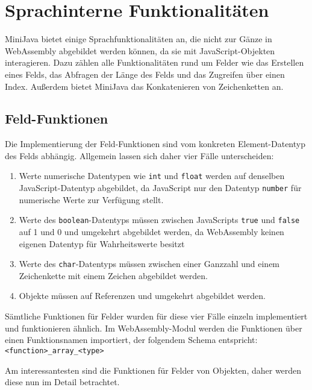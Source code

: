 \section{Sprachinterne Funktionalitäten}
\label{sec:Sprachinterne-Funktionalitäten}

MiniJava bietet einige Sprachfunktionalitäten an, die nicht zur Gänze in WebAssembly abgebildet werden können, da sie mit JavaScript-Objekten interagieren. Dazu zählen alle Funktionalitäten rund um Felder wie das Erstellen eines Felds, das Abfragen der Länge des Felds und das Zugreifen über einen Index. Außerdem bietet MiniJava das Konkatenieren von Zeichenketten an.

\subsection{Feld-Funktionen}
\label{subsec:Feld-Funktionen}

Die Implementierung der Feld-Funktionen sind vom konkreten Element-Datentyp des Felds abhängig. Allgemein lassen sich daher vier Fälle unterscheiden:

\begin{enumerate}
    \item Werte numerische Datentypen wie \lstinline{int} und \lstinline{float} werden auf denselben Ja\-va\-Script-Da\-ten\-typ abgebildet, da JavaScript nur den Datentyp \lstinline{number} für numerische Werte zur Verfügung stellt.
    \item Werte des \lstinline{boolean}-Datentyps müssen zwischen JavaScripts \lstinline{true} und \lstinline{false} auf 1 und 0 und umgekehrt abgebildet werden, da WebAssembly keinen eigenen Datentyp für Wahrheitswerte besitzt
    \item Werte des \lstinline{char}-Datentyps müssen zwischen einer Ganzzahl und einem Zeichenkette mit einem Zeichen abgebildet werden.
    \item Objekte  müssen auf Referenzen und umgekehrt abgebildet werden. 
\end{enumerate}

Sämtliche Funktionen für Felder wurden für diese vier Fälle einzeln implementiert und funktionieren ähnlich. Im WebAssembly-Modul werden die Funktionen über einen Funktionsnamen importiert, der folgendem Schema entspricht: \\
\lstinline{<function>_array_<type>}

Am interessantesten sind die Funktionen für Felder von Objekten, daher werden diese nun im Detail betrachtet.

